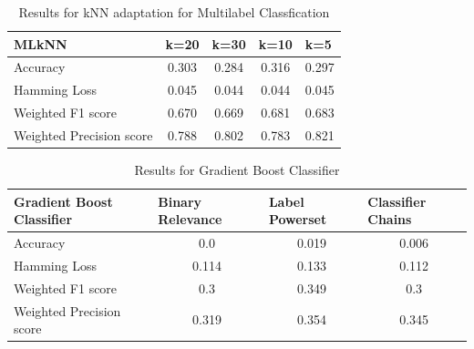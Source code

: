 \begin{table}[!htb]
    \centering
    \begin{tabular}{|l|c|c|c|l|}
\hline
MLkNN                    & \multicolumn{1}{l|}{k=20} & \multicolumn{1}{l|}{k=30} & \multicolumn{1}{l|}{k=10} & k=5   \\ \hline
Accuracy                 & 0.303                     & 0.284                     & 0.316                     & 0.297 \\ \hline
Hamming Loss             & 0.045                     & 0.044                     & 0.044                     & 0.045 \\ \hline
Weighted F1 score        & 0.670                     & 0.669                     & 0.681                     & 0.683 \\ \hline
Weighted Precision score & 0.788                     & 0.802                     & 0.783                     & 0.821 \\ \hline
\end{tabular}
    \caption{Results for kNN adaptation for Multilabel Classfication}
    \label{tab:MLkNN}
\end{table}
\begin{table}[!htb]
    \centering
    \begin{tabular}{|l|c|c|c|}
\hline
Gradient Boost Classifier & \multicolumn{1}{l|}{Binary Relevance} & \multicolumn{1}{l|}{Label Powerset} & \multicolumn{1}{l|}{Classifier Chains} \\ \hline
Accuracy                   & 0.0                                   & 0.019                               & 0.006                                  \\ \hline
Hamming Loss               & 0.114                                 & 0.133                               & 0.112                                  \\ \hline
Weighted F1 score          & 0.3                                   & 0.349                               & 0.3                                    \\ \hline
Weighted Precision score   & 0.319                                 & 0.354                               & 0.345                                  \\ \hline
\end{tabular}
    \caption{Results for Gradient Boost Classifier}
    \label{tab:gradientboost}
\end{table}

